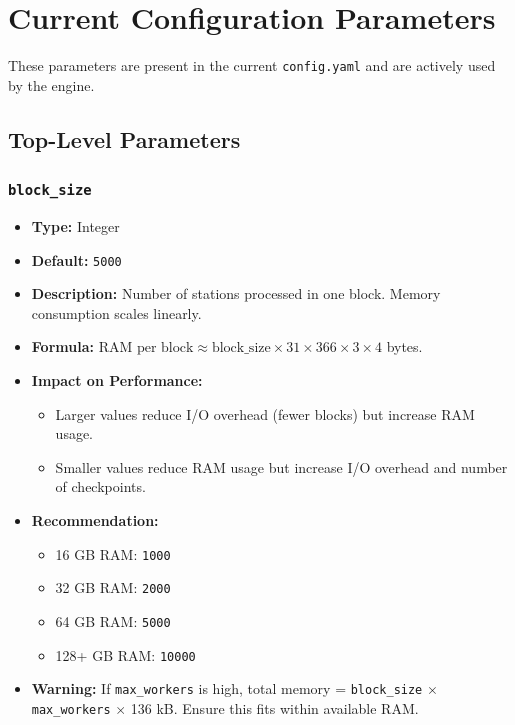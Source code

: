 \documentclass[12pt,a4paper]{article}
\begin{document}
\section{Current Configuration Parameters}

These parameters are present in the current \texttt{config.yaml} and are actively used by the engine.

\subsection{Top-Level Parameters}

\subsubsection{\texttt{block\_size}}
\begin{itemize}[leftmargin=*]
    \item \textbf{Type:} Integer
    \item \textbf{Default:} \texttt{5000}
    \item \textbf{Description:} Number of stations processed in one block. Memory consumption scales linearly.
    \item \textbf{Formula:} \(\text{RAM per block} \approx \text{block\_size} \times 31 \times 366 \times 3 \times 4\) bytes.
    \item \textbf{Impact on Performance:}
        \begin{itemize}
            \item Larger values reduce I/O overhead (fewer blocks) but increase RAM usage.
            \item Smaller values reduce RAM usage but increase I/O overhead and number of checkpoints.
        \end{itemize}
    \item \textbf{Recommendation:}
        \begin{itemize}
            \item 16 GB RAM: \texttt{1000}
            \item 32 GB RAM: \texttt{2000}
            \item 64 GB RAM: \texttt{5000}
            \item 128+ GB RAM: \texttt{10000}
        \end{itemize}
    \item \textbf{Warning:} If \texttt{max\_workers} is high, total memory = \texttt{block\_size} \(\times\) \texttt{max\_workers} \(\times\) 136 kB. Ensure this fits within available RAM.
\end{itemize}
\end{document}
